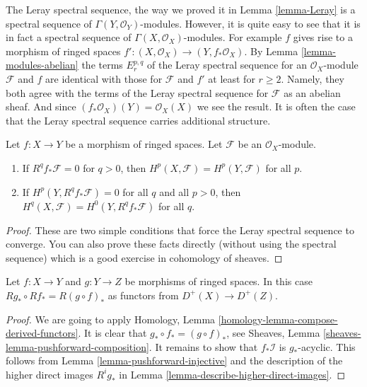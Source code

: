 \begin{remark}
\label{remark-Leray-ss-more-structure}
The Leray spectral sequence, the way we proved it in Lemma \ref{lemma-Leray}
is a spectral sequence of $\Gamma(Y, \mathcal{O}_Y)$-modules. However, it
is quite easy to see that it is in fact a spectral sequence of
$\Gamma(X, \mathcal{O}_X)$-modules. For example $f$ gives rise to
a morphism of ringed spaces
$f' :  (X, \mathcal{O}_X) \to (Y, f_*\mathcal{O}_X)$.
By Lemma \ref{lemma-modules-abelian} the terms $E_r^{p, q}$ of the
Leray spectral sequence for an $\mathcal{O}_X$-module $\mathcal{F}$
and $f$ are identical with those for $\mathcal{F}$ and $f'$
at least for $r \geq 2$. Namely, they both agree with the terms of the Leray
spectral sequence for $\mathcal{F}$ as an abelian sheaf.
And since $(f_*\mathcal{O}_X)(Y) = \mathcal{O}_X(X)$ we see the result.
It is often the case
that the Leray spectral sequence carries additional structure.
\end{remark}

\begin{lemma}
\label{lemma-apply-Leray}
Let $f : X \to Y$ be a morphism of ringed spaces.
Let $\mathcal{F}$ be an $\mathcal{O}_X$-module.
\begin{enumerate}
\item If $R^qf_*\mathcal{F} = 0$ for $q > 0$, then
$H^p(X, \mathcal{F}) = H^p(Y, \mathcal{F})$ for all $p$.
\item If $H^p(Y, R^qf_*\mathcal{F}) = 0$ for all $q$ and all $p > 0$, then
$H^q(X, \mathcal{F}) = H^0(Y, R^qf_*\mathcal{F})$ for all $q$.
\end{enumerate}
\end{lemma}

\begin{proof}
These are two simple conditions that force the Leray spectral sequence to
converge. You can also prove these facts directly (without using the
spectral sequence) which is a good exercise in cohomology of sheaves.
\end{proof}

\begin{lemma}
\label{lemma-higher-direct-images-compose}
Let $f : X \to Y$ and $g : Y \to Z$ be morphisms of ringed spaces.
In this case $Rg_* \circ Rf_* = R(g \circ f)_*$ as functors
from $D^{+}(X) \to D^{+}(Z)$.
\end{lemma}

\begin{proof}
We are going to apply
Homology, Lemma \ref{homology-lemma-compose-derived-functors}.
It is clear that $g_* \circ f_* = (g \circ f)_*$, see
Sheaves, Lemma \ref{sheaves-lemma-pushforward-composition}.
It remains to show that $f_*\mathcal{I}$ is $g_*$-acyclic.
This follows from Lemma \ref{lemma-pushforward-injective}
and the description of the
higher direct images $R^ig_*$ in
Lemma \ref{lemma-describe-higher-direct-images}.
\end{proof}


